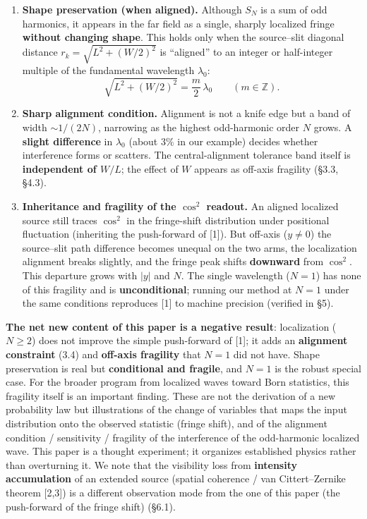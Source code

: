 \documentclass[
]{article}
\newcounter{none} %
\providecommand{\tightlist}{%
  \setlength{\itemsep}{0pt}\setlength{\parskip}{0pt}}
\begin{document}
\begin{enumerate}
\def\labelenumi{\arabic{enumi}.}
\tightlist
\item
  \textbf{Shape preservation (when aligned).} Although \(S_N\) is a sum
  of odd harmonics, it appears in the far field as a single, sharply
  localized fringe \textbf{without changing shape}. This holds only when
  the source--slit diagonal distance \(r_k=\sqrt{L^2+(W/2)^2}\) is
  ``aligned'' to an integer or half-integer multiple of the fundamental
  wavelength \(\lambda_0\):
  \[\sqrt{L^{2}+(W/2)^{2}}=\frac{m}{2}\,\lambda_0\qquad(m\in\mathbb{Z}).\]
\item
  \textbf{Sharp alignment condition.} Alignment is not a knife edge but
  a band of width \(\sim 1/(2N)\), narrowing as the highest odd-harmonic
  order \(N\) grows. A \textbf{slight difference} in \(\lambda_0\)
  (about \(3\%\) in our example) decides whether interference forms or
  scatters. The central-alignment tolerance band itself is
  \textbf{independent of \(W/L\)}; the effect of \(W\) appears as
  off-axis fragility (§3.3, §4.3).
\item
  \textbf{Inheritance and fragility of the \(\cos^2\) readout.} An
  aligned localized source still traces \(\cos^2\) in the fringe-shift
  distribution under positional fluctuation (inheriting the push-forward
  of {[}1{]}). But off-axis (\(y\neq0\)) the source--slit path
  difference becomes unequal on the two arms, the localization alignment
  breaks slightly, and the fringe peak shifts \textbf{downward} from
  \(\cos^2\). This departure grows with \(|y|\) and \(N\). The single
  wavelength (\(N=1\)) has none of this fragility and is
  \textbf{unconditional}; running our method at \(N=1\) under the same
  conditions reproduces {[}1{]} to machine precision (verified in §5).
\end{enumerate}

\textbf{The net new content of this paper is a negative result}:
localization (\(N\ge2\)) does not improve the simple push-forward of
{[}1{]}; it adds an \textbf{alignment constraint} (3.4) and
\textbf{off-axis fragility} that \(N=1\) did not have. Shape
preservation is real but \textbf{conditional and fragile}, and \(N=1\)
is the robust special case. For the broader program from localized waves
toward Born statistics, this fragility itself is an important finding.
These are not the derivation of a new probability law but illustrations
of the change of variables that maps the input distribution onto the
observed statistic (fringe shift), and of the alignment condition /
sensitivity / fragility of the interference of the odd-harmonic
localized wave. This paper is a thought experiment; it organizes
established physics rather than overturning it. We note that the
visibility loss from \textbf{intensity accumulation} of an extended
source (spatial coherence / van Cittert--Zernike theorem {[}2,3{]}) is a
different observation mode from the one of this paper (the push-forward
of the fringe shift) (§6.1).
\end{document}
